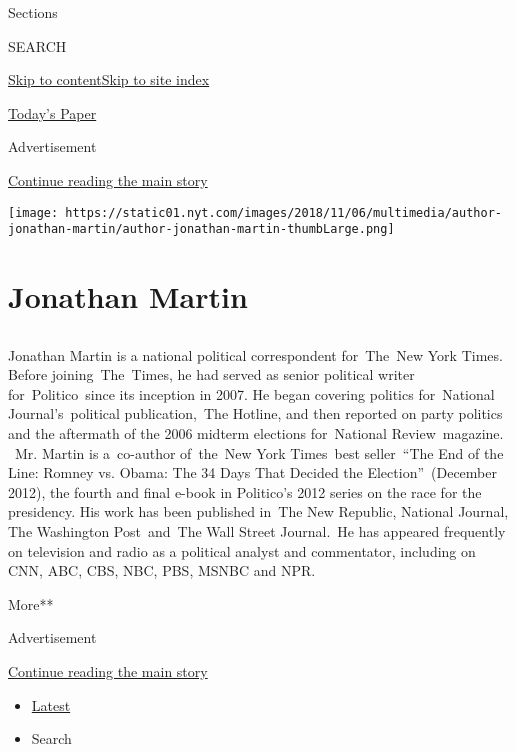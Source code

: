 Sections

SEARCH

\protect\hyperlink{site-content}{Skip to
content}\protect\hyperlink{site-index}{Skip to site index}

\href{https://myaccount.nytimes.com/auth/login?response_type=cookie\&client_id=vi}{}

\href{https://www.nytimes.com/section/todayspaper}{Today's Paper}

Advertisement

\protect\hyperlink{after-top}{Continue reading the main story}

\texttt{[image: https://static01.nyt.com/images/2018/11/06/multimedia/author-jonathan-martin/author-jonathan-martin-thumbLarge.png]}

\hypertarget{jonathan-martin}{%
\section{Jonathan Martin}\label{jonathan-martin}}

\hypertarget{section}{%
\subsection{}\label{section}}

Jonathan Martin is a national political correspondent for~The~New York
Times. Before joining~The~Times, he had served as senior political
writer for~Politico~since its inception in 2007. He began covering
politics for~National Journal's~political publication,~The Hotline, and
then reported on party politics and the aftermath of the 2006 midterm
elections for~National Review~magazine. ~Mr. Martin is a~co-author
of~the~New York Times~best seller~``The End of the Line: Romney vs.
Obama: The 34 Days That Decided the Election''~(December 2012), the
fourth and final e-book in Politico's 2012 series on the race for the
presidency. His work has been published in~The New Republic, National
Journal, The Washington Post~and~The Wall Street Journal.~He has
appeared frequently on television and radio as a political analyst and
commentator, including on CNN, ABC, CBS, NBC, PBS, MSNBC and NPR.

More**

Advertisement

\protect\hyperlink{after-mid1}{Continue reading the main story}

\begin{itemize}
\tightlist
\item
  \protect\hyperlink{stream-panel}{Latest}
\item
  Search
\end{itemize}

